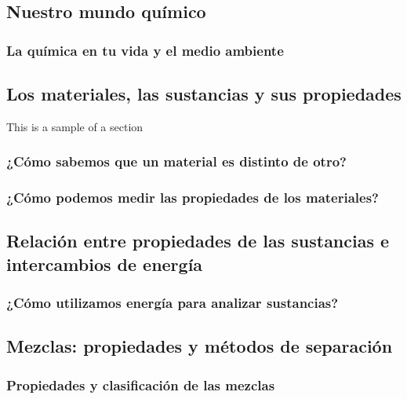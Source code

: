 \documentclass[11pt]{book}
\begin{document}
\pagestyle{empty}

\restoregeometry
{}
\tableofcontents
\newpage
\chapter{}
\pagestyle{fancy}
\newpage \thispagestyle{plain}
\section{Nuestro mundo químico}
\subsection{La química en tu vida y el medio ambiente }

\newpage \thispagestyle{plain}
\section{Los materiales, las sustancias y sus propiedades}
This is a sample of a section
\subsection{¿Cómo sabemos que un material es distinto de otro?}
\subsection{¿Cómo podemos medir las propiedades de los materiales?}
\newpage \thispagestyle{plain}
\section{Relación entre propiedades de las sustancias e intercambios de energía}
\subsection{¿Cómo utilizamos energía para analizar sustancias?}

\newpage \thispagestyle{plain}
\section{Mezclas: propiedades y métodos de separación}

\subsection{Propiedades y clasificación de las mezclas}
\end{document}
